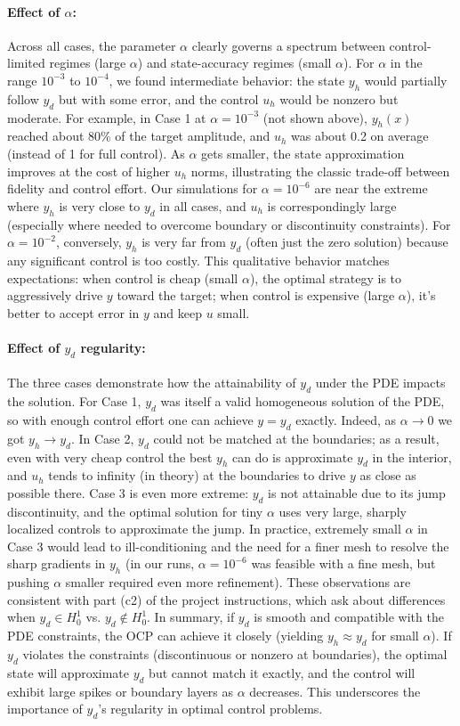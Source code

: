 \paragraph{Effect of $\alpha$:}
Across all cases, the parameter $\alpha$ clearly governs a spectrum between control-limited regimes (large $\alpha$) and state-accuracy regimes (small $\alpha$).
For $\alpha$ in the range $10^{-3}$ to $10^{-4}$, we found intermediate behavior: the state $y_h$ would partially follow $y_d$ but with some error, and the control $u_h$ would be nonzero but moderate.
For example, in Case 1 at $\alpha=10^{-3}$ (not shown above), $y_h(x)$ reached about 80\% of the target amplitude, and $u_h$ was about 0.2 on average (instead of 1 for full control). As $\alpha$ gets smaller, the state approximation improves at the cost of higher $u_h$ norms, illustrating the classic trade-off between fidelity and control effort. Our simulations for $\alpha=10^{-6}$ are near the extreme where $y_h$ is very close to $y_d$ in all cases, and $u_h$ is correspondingly large (especially where needed to overcome boundary or discontinuity constraints). For $\alpha=10^{-2}$, conversely, $y_h$ is very far from $y_d$ (often just the zero solution) because any significant control is too costly.
This qualitative behavior matches expectations: when control is cheap (small $\alpha$), the optimal strategy is to aggressively drive $y$ toward the target; when control is expensive (large $\alpha$), it's better to accept error in $y$ and keep $u$ small.
\paragraph{Effect of $y_d$ regularity:} The three cases demonstrate how the attainability of $y_d$ under the PDE impacts the solution. For Case 1, $y_d$ was itself a valid homogeneous solution of the PDE, so with enough control effort one can achieve $y=y_d$ exactly. Indeed, as $\alpha\to 0$ we got $y_h\to y_d$. In Case 2, $y_d$ could not be matched at the boundaries; as a result, even with very cheap control the best $y_h$ can do is approximate $y_d$ in the interior, and $u_h$ tends to infinity (in theory) at the boundaries to drive $y$ as close as possible there. Case 3 is even more extreme: $y_d$ is not attainable due to its jump discontinuity, and the optimal solution for tiny $\alpha$ uses very large, sharply localized controls to approximate the jump. In practice, extremely small $\alpha$ in Case 3 would lead to ill-conditioning and the need for a finer mesh to resolve the sharp gradients in $y_h$ (in our runs, $\alpha=10^{-6}$ was feasible with a fine mesh, but pushing $\alpha$ smaller required even more refinement). These observations are consistent with part (c2) of the project instructions, which ask about differences when $y_d \in H^1_0$ vs. $y_d\notin H^1_0$.
In summary, if $y_d$ is smooth and compatible with the PDE constraints, the OCP can achieve it closely (yielding $y_h \approx y_d$ for small $\alpha$). If $y_d$ violates the constraints (discontinuous or nonzero at boundaries), the optimal state will approximate $y_d$ but cannot match it exactly, and the control will exhibit large spikes or boundary layers as $\alpha$ decreases. This underscores the importance of $y_d$'s regularity in optimal control problems.


